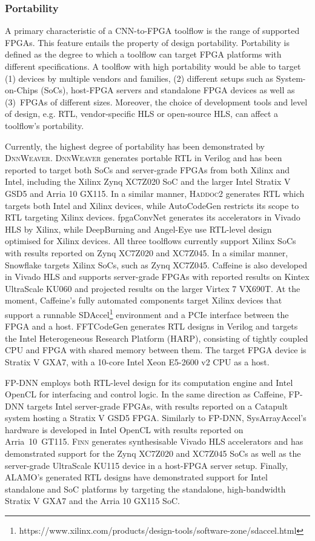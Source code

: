 \documentclass[format=acmsmall, review=false, screen=true]{acmart}
\begin{document}
\subsubsection{Portability}
A primary characteristic of a CNN-to-FPGA toolflow is the range of supported FPGAs. This feature entails the property of design portability. Portability is defined as the degree to which a toolflow can target FPGA platforms with different specifications. A toolflow with high portability would be able to target (1) devices by multiple vendors and families, (2) different setups such as System-on-Chips (SoCs), host-FPGA servers and standalone FPGA devices as well as \mbox{(3) FPGAs} of different sizes. Moreover, the choice of development tools and level of design, e.g. RTL, vendor-specific HLS or open-source HLS, can affect a toolflow's portability.

Currently, the highest degree of portability has been demonstrated by \textsc{DnnWeaver}. \textsc{DnnWeaver} generates portable RTL in Verilog and has been reported to target both SoCs and server-grade FPGAs from both Xilinx and Intel, including the Xilinx Zynq XC7Z020 SoC and the larger Intel Stratix V GSD5 and Arria 10 GX115. {\color{black}In a similar manner, \textsc{Haddoc2} generates RTL which targets both Intel and Xilinx devices, while AutoCodeGen restricts its scope to RTL targeting Xilinx devices.} {\color{black}fpgaConvNet generates its accelerators in Vivado HLS by Xilinx, while DeepBurning and Angel-Eye use RTL-level design optimised for Xilinx devices.} All three toolflows currently support Xilinx SoCs with results reported on Zynq XC7Z020 and XC7Z045. {\color{black}In a similar manner, Snowflake targets Xilinx SoCs, such as Zynq XC7Z045.} Caffeine is also developed in Vivado HLS and supports server-grade FPGAs with reported results on Kintex UltraScale KU060 and projected results on the larger Virtex 7 VX690T. At the moment, Caffeine's fully automated components target Xilinx devices that support a runnable SDAccel\footnote{https://www.xilinx.com/products/design-tools/software-zone/sdaccel.html} environment and a PCIe interface between the FPGA and a host. {\color{black}FFTCodeGen generates RTL designs in Verilog and targets the Intel Heterogeneous Research Platform (HARP), consisting of tightly coupled CPU and FPGA with shared memory between them. The target FPGA device is Stratix V GXA7, with a 10-core Intel Xeon E5-2600 v2 CPU as a host.}

FP-DNN employs both RTL-level design for its computation engine and Intel OpenCL for interfacing and control logic. In the same direction as Caffeine, FP-DNN targets Intel server-grade FPGAs, with results reported on a Catapult system \cite{Caulfield2016} hosting a Stratix V GSD5 FPGA. Similarly to FP-DNN, SysArrayAccel's hardware is developed in Intel OpenCL with results reported on \mbox{Arria 10 GT115}. \textsc{Finn} generates synthesisable Vivado HLS accelerators and has demonstrated support for the Zynq XC7Z020 and XC7Z045 SoCs as well as the server-grade UltraScale KU115 device in a host-FPGA server setup. Finally, ALAMO's generated RTL designs have demonstrated support for Intel standalone {\color{black}and SoC} platforms by targeting the standalone, high-bandwidth Stratix V GXA7 {\color{black}and the Arria 10 GX115 SoC}.
\end{document}
